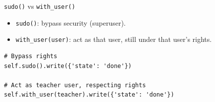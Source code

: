 \begin{frame}[fragile]{\texttt{sudo()} vs \texttt{with\_user()}}
	\begin{itemize}
		\item \texttt{sudo()}: bypass security (superuser).
		\item \texttt{with\_user(user)}: act as that user, still under that user's rights.
	\end{itemize}
\begin{lstlisting}
# Bypass rights
self.sudo().write({'state': 'done'})

# Act as teacher user, respecting rights
self.with_user(teacher).write({'state': 'done'})
\end{lstlisting}
\end{frame}
